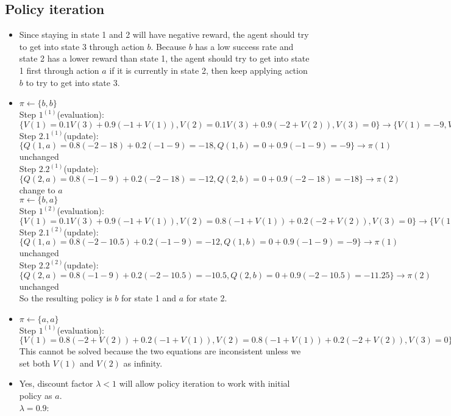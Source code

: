 \documentclass[11pt]{article}
\begin{document}
\begin{onehalfspace}
\section{Policy iteration}
\begin{itemize}
\item Since staying in state 1 and 2 will have negative reward, the agent should try to get into state 3 through action $b$. Because $b$ has a low success rate and state 2 has a lower reward than state 1, the agent should try to get into state 1 first through action $a$ if it is currently in state 2, then keep applying action $b$ to try to get into state 3.
\item
$\pi \leftarrow \{b, b\}$\\
Step $1^{(1)}$(evaluation): $\{V(1) = 0.1V(3) + 0.9(-1 + V(1)), V(2) = 0.1V(3) + 0.9(-2 + V(2)), V(3) = 0\} \rightarrow \{V(1) = -9, V(2) = -18, V(3) = 0\}$\\
Step $2.1^{(1)}$(update): $\{Q(1, a) = 0.8(-2 - 18) + 0.2(-1 - 9) = -18, Q(1,b) = 0 + 0.9(-1-9) = -9\} \rightarrow \pi(1)$ unchanged\\
Step $2.2^{(1)}$(update): $\{Q(2, a) = 0.8(-1 - 9) + 0.2(-2 - 18) = -12, Q(2, b) = 0 + 0.9(-2-18)=-18\} \rightarrow \pi(2)$ change to $a$\\
$\pi \leftarrow \{b, a\}$\\
Step $1^{(2)}$(evaluation): $\{V(1)= 0.1V(3) + 0.9(-1 + V(1)), V(2) = 0.8(-1 + V(1)) + 0.2(-2 + V(2)), V(3) = 0\} \rightarrow \{V(1) = -9, V(2) = -10.5, V(3) = 0\}$
Step $2.1^{(2)}$(update): $\{Q(1, a) = 0.8(-2 - 10.5) + 0.2(-1 - 9) = -12, Q(1,b) = 0 + 0.9(-1-9) = -9\} \rightarrow \pi(1)$ unchanged\\
Step $2.2^{(2)}$(update): $\{Q(2, a) = 0.8(-1 - 9) + 0.2(-2 - 10.5) = -10.5, Q(2, b) = 0 + 0.9(-2-10.5)=-11.25\} \rightarrow \pi(2)$ unchanged\\
So the resulting policy is $b$ for state 1 and $a$ for state 2.
\item
$\pi \leftarrow \{a, a\}$\\
Step $1^{(1)}$(evaluation): $\{V(1) = 0.8(-2+V(2)) + 0.2(-1+V(1)), V(2) = 0.8(-1+V(1))+0.2(-2+V(2)), V(3) = 0\}$\\
This cannot be solved because the two equations are inconsistent unless we set both $V(1)$ and $V(2)$ as infinity.
\item
Yes, discount factor $\lambda < 1$ will allow policy iteration to work with initial policy as $a$.\\
$\lambda = 0.9$:\\

\end{itemize}
\end{onehalfspace}
\end{document}
